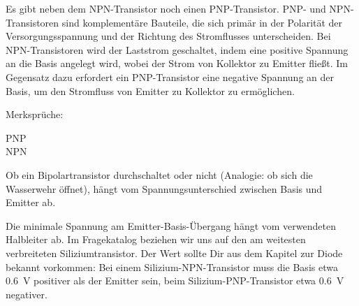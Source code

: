 \begin{ohmchapter}
    Es gibt neben dem NPN-Transistor noch einen PNP-Transistor.
    PNP- und NPN-Transistoren sind komplementäre Bauteile, die sich primär in der Polarität der Versorgungsspannung und der Richtung des Stromflusses unterscheiden. Bei NPN-Transistoren wird der Laststrom geschaltet, indem eine positive Spannung an die Basis angelegt wird, wobei der Strom von Kollektor zu Emitter fließt. Im Gegensatz dazu erfordert ein PNP-Transistor eine negative Spannung an der Basis, um den Stromfluss von Emitter zu Kollektor zu ermöglichen.

   \noindent Merksprüche: 
    \begin{description}
      \item[PNP] 
      \item[NPN]    
    \end{description}

    Ob ein Bipolartransistor durchschaltet oder nicht (Analogie: ob sich die Wasserwehr öffnet), hängt vom Spannungsunterschied zwischen Basis und Emitter ab.
    
    Die minimale Spannung am Emitter-Basis-Übergang hängt vom verwendeten Halbleiter ab. Im Fragekatalog beziehen wir uns auf den am weitesten verbreiteten Siliziumtransistor. Der Wert sollte Dir aus dem Kapitel zur Diode bekannt vorkommen:
    Bei einem Silizium-NPN-Transistor muss die Basis etwa \SI{0.6}{\volt} positiver als der Emitter sein, beim Silizium-PNP-Transistor etwa \SI{0.6}{\volt} negativer.

\end{ohmchapter}